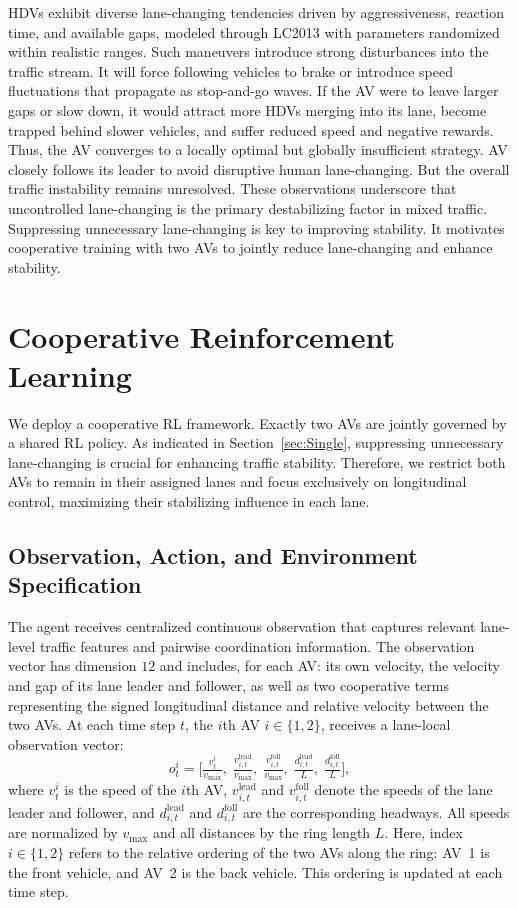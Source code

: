 \documentclass{ifacconf}
\newcommand{\1}{\mbox{1}\hspace{-0.25em}\mbox{l}}
\begin{document}
HDVs exhibit diverse lane-changing tendencies driven by aggressiveness, reaction time, and available gaps, modeled through LC2013 with parameters randomized within realistic ranges.
 Such maneuvers introduce strong disturbances into the traffic stream. It will force following vehicles to brake or introduce speed fluctuations that propagate as stop-and-go waves.
If the AV were to leave larger gaps or slow down, it would attract more HDVs merging into its lane, become trapped behind slower vehicles, and suffer reduced speed and negative rewards. Thus, the AV converges to a locally optimal but globally insufficient strategy. AV closely follows its leader to avoid disruptive human lane-changing. But the overall traffic instability remains unresolved. These observations underscore that uncontrolled lane-changing is the primary destabilizing factor in mixed traffic. Suppressing unnecessary lane-changing is key to improving stability. It motivates cooperative training with two AVs to jointly reduce lane-changing and enhance stability. 


\section{Cooperative Reinforcement Learning}
\label{sec:Cooperative}
We deploy a cooperative RL framework. Exactly two AVs are jointly governed by a shared RL policy. As indicated in Section~\ref{sec:Single}, suppressing unnecessary lane-changing is crucial for enhancing traffic stability. Therefore, we restrict both AVs to remain in their assigned lanes and focus exclusively on longitudinal control, maximizing their stabilizing influence in each lane.
\subsection{Observation, Action, and Environment Specification}
The agent receives centralized continuous observation that captures relevant lane-level traffic features and pairwise coordination information. The observation vector has dimension $12$ and includes, for each AV: its own velocity, the velocity and gap of its lane leader and follower, as well as two cooperative terms representing the signed longitudinal distance and relative velocity between the two AVs. 
At each time step $t$, the $i$th AV $i \in \{1,2\}$, receives a lane-local observation vector:
\begin{equation}
o^{i}_{t} =
\Big[
    \tfrac{v_t^i}{v_{\max}},\;
    \tfrac{v^{\mathrm{lead}}_{i,t}}{v_{\max}},\;
    \tfrac{v^{\mathrm{foll}}_{i,t}}{v_{\max}},\;
    \tfrac{d^{\mathrm{lead}}_{i,t}}{L},\;
    \tfrac{d^{\mathrm{foll}}_{i,t}}{L}
\Big],
\end{equation}
where $v_t^i$ is the speed of the $i$th AV, 
$v^{\mathrm{lead}}_{i,t}$ and $v^{\mathrm{foll}}_{i,t}$ denote the speeds of the lane leader and follower,
and $d^{\mathrm{lead}}_{i,t}$ and $d^{\mathrm{foll}}_{i,t}$ are the corresponding headways.  
All speeds are normalized by $v_{\max}$ and all distances by the ring length $L$. Here, index $i \in \{1,2\}$ refers to the relative ordering of the two AVs
along the ring: AV~1 is the front vehicle, and AV~2 is the back 
vehicle. This ordering is updated at each time step.
\end{document}
